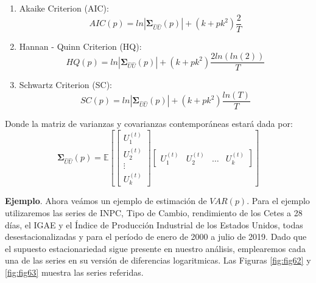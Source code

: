 \documentclass[
]{book}
\begin{document}
\begin{enumerate}
\def\labelenumi{\arabic{enumi}.}
\setcounter{enumi}{1}
\item
  Akaike Criterion (AIC): \begin{equation}
       AIC(p) = ln|\mathbf{\Sigma}_{\hat{U}\hat{U}}(p)| + (k + p k^2) \frac{2}{T}
       \end{equation}
\item
  Hannan - Quinn Criterion (HQ): \begin{equation}
       HQ(p) = ln|\mathbf{\Sigma}_{\hat{U}\hat{U}}(p)| + (k + p k^2) \frac{2ln(ln(2))}{T}
       \end{equation}
\item
  Schwartz Criterion (SC): \begin{equation}
       SC(p) = ln|\mathbf{\Sigma}_{\hat{U}\hat{U}}(p)| + (k + p k^2) \frac{ln(T)}{T}
       \end{equation}
\end{enumerate}

Donde la matriz de varianzas y covarianzas contemporáneas estará dada
por: \begin{equation*}
            \mathbf{\Sigma}_{\hat{U}\hat{U}}(p) = \mathbb{E} \left[
            \begin{bmatrix}
            U^{(t)}_{1} \\ U^{(t)}_{2} \\ \vdots \\ U^{(t)}_{k}
            \end{bmatrix}
            \begin{bmatrix}
            U^{(t)}_{1} & U^{(t)}_{2} & \ldots & U^{(t)}_{k}
            \end{bmatrix}
            \right]
    \end{equation*}

\textbf{Ejemplo}. Ahora veámos un ejemplo de estimación de \(VAR(p)\).
Para el ejemplo utilizaremos las series de INPC, Tipo de Cambio,
rendimiento de los Cetes a 28 días, el IGAE y el Índice de Producción
Industrial de los Estados Unidos, todas desestacionalizadas y para el
período de enero de 2000 a julio de 2019. Dado que el supuesto
estacionariedad sigue presente en nuestro análisis, emplearemos cada una
de las series en su versión de diferencias logaritmicas. Las Figuras
\ref{fig:fig62} y \ref{fig:fig63} muestra las series referidas.
\end{document}
